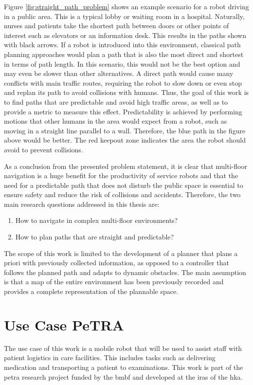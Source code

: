 Figure \ref{fig:straight_path_problem} shows an example scenario for a robot driving in a public area. This is a typical lobby or waiting room in a hospital. Naturally, nurses and patients take the shortest path between doors or other points of interest such as elevators or an information desk. This results in the paths shown with black arrows. If a robot is introduced into this environment, classical path planning approaches would plan a path that is also the most direct and shortest in terms of path length. In this scenario, this would not be the best option and may even be slower than other alternatives. A direct path would cause many conflicts with main traffic routes, requiring the robot to slow down or even stop and replan its path to avoid collisions with humans. Thus, the goal of this work is to find paths that are predictable and avoid high traffic areas, as well as to provide a metric to measure this effect. Predictability is achieved by performing motions that other humans in the area would expect from a robot, such as moving in a straight line parallel to a wall. Therefore, the blue path in the figure above would be better. The red keepout zone indicates the area the robot should avoid to prevent collisions.

As a conclusion from the presented problem statement, it is clear that multi-floor navigation is a huge benefit for the productivity of service robots and that the need for a predictable path that does not disturb the public space is essential to ensure safety and reduce the risk of collisions and accidents. Therefore, the two main research questions addressed in this thesis are:
\begin{enumerate}
    \item How to navigate in complex multi-floor environments?
    \item How to plan paths that are straight and predictable?
\end{enumerate}

The scope of this work is limited to the development of a planner that plans a priori with previously collected information, as opposed to a controller that follows the planned path and adapts to dynamic obstacles. The main assumption is that a map of the entire environment has been previously recorded and provides a complete representation of the plannable space.

\section{Use Case PeTRA}
\label{sec:use_case}
The use case of this work is a mobile robot that will be used to assist staff with patient logistics in care facilities. This includes tasks such as delivering medication and transporting a patient to examinations. This work is part of the \gls{petra} research project funded by the \gls{bmbf} \cite{bmbf-internetredaktion_bekanntmachung_2018} and developed at the \gls{iras} of the \gls{hka}.


